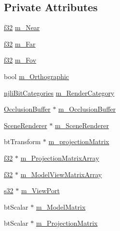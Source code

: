 \subsection*{Private Attributes}
\begin{DoxyCompactItemize}
\item 
\mbox{\hyperlink{_util_8h_a5f6906312a689f27d70e9d086649d3fd}{f32}} \mbox{\hyperlink{classnjli_1_1_camera_a648b79887b9acf3fb12dd7006a68cb85}{m\+\_\+\+Near}}
\item 
\mbox{\hyperlink{_util_8h_a5f6906312a689f27d70e9d086649d3fd}{f32}} \mbox{\hyperlink{classnjli_1_1_camera_a34d45ec43ca2eec498138e80685d8ffc}{m\+\_\+\+Far}}
\item 
\mbox{\hyperlink{_util_8h_a5f6906312a689f27d70e9d086649d3fd}{f32}} \mbox{\hyperlink{classnjli_1_1_camera_aab4d792e3aeaf5cf1072d0a75d4d4f58}{m\+\_\+\+Fov}}
\item 
bool \mbox{\hyperlink{classnjli_1_1_camera_a140d99f05bf37657affe3006d7c2f00a}{m\+\_\+\+Orthographic}}
\item 
\mbox{\hyperlink{namespacenjli_af7b302a2b48bb644f85c88080925c974}{njli\+Bit\+Categories}} \mbox{\hyperlink{classnjli_1_1_camera_a7fb57199725228cab2ac28462cfb7967}{m\+\_\+\+Render\+Category}}
\item 
\mbox{\hyperlink{classnjli_1_1_camera_af60c965608a88762c5d3b48490472319}{Occlusion\+Buffer}} $\ast$ \mbox{\hyperlink{classnjli_1_1_camera_a6cd9448c2d481d6b5550bad78201be2a}{m\+\_\+\+Occlusion\+Buffer}}
\item 
\mbox{\hyperlink{classnjli_1_1_camera_aae6efa51fde36cf2c0759009ba7b19c0}{Scene\+Renderer}} $\ast$ \mbox{\hyperlink{classnjli_1_1_camera_aa5b56fb8e1f66bcc1e97cc06708d438e}{m\+\_\+\+Scene\+Renderer}}
\item 
bt\+Transform $\ast$ \mbox{\hyperlink{classnjli_1_1_camera_a8b02bb72aff457b5d68970d266348131}{m\+\_\+projection\+Matrix}}
\item 
\mbox{\hyperlink{_util_8h_a5f6906312a689f27d70e9d086649d3fd}{f32}} $\ast$ \mbox{\hyperlink{classnjli_1_1_camera_a513f74848a02e22d38fa2f4b83306363}{m\+\_\+\+Projection\+Matrix\+Array}}
\item 
\mbox{\hyperlink{_util_8h_a5f6906312a689f27d70e9d086649d3fd}{f32}} $\ast$ \mbox{\hyperlink{classnjli_1_1_camera_ac14bac7824b812adeb752894023376fe}{m\+\_\+\+Model\+View\+Matrix\+Array}}
\item 
\mbox{\hyperlink{_util_8h_aa62c75d314a0d1f37f79c4b73b2292e2}{s32}} $\ast$ \mbox{\hyperlink{classnjli_1_1_camera_a0ac4d128631b54a0a5ab1d023c565b73}{m\+\_\+\+View\+Port}}
\item 
bt\+Scalar $\ast$ \mbox{\hyperlink{classnjli_1_1_camera_a0cf1d4419f8b9414ba59ce9229ca1037}{m\+\_\+\+Model\+Matrix}}
\item 
bt\+Scalar $\ast$ \mbox{\hyperlink{classnjli_1_1_camera_a7d25685257aaa004c1aa1aed8376fe49}{m\+\_\+\+Projection\+Matrix}}
\end{DoxyCompactItemize}
